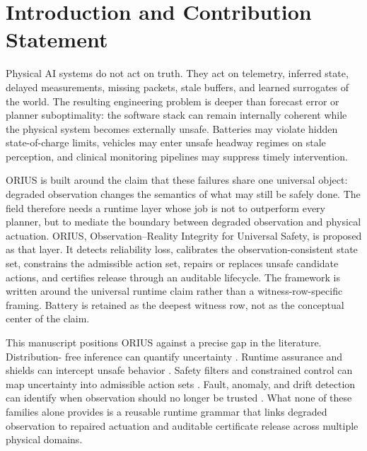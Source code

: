 \section{Introduction and Contribution Statement}
\label{sec:prof-introduction}

Physical AI systems do not act on truth. They act on telemetry, inferred state, delayed
measurements, missing packets, stale buffers, and learned surrogates of the world. The
resulting engineering problem is deeper than forecast error or planner suboptimality:
the software stack can remain internally coherent while the physical system becomes
externally unsafe. Batteries may violate hidden state-of-charge limits, vehicles may
enter unsafe headway regimes on stale perception, and clinical monitoring pipelines
may suppress timely intervention.

ORIUS is built around the claim that these failures share one universal object:
degraded observation changes the semantics of what may still be safely done. The field
therefore needs a runtime layer whose job is not to outperform every planner, but to
mediate the boundary between degraded observation and physical actuation. ORIUS,
Observation--Reality Integrity for Universal Safety, is proposed as that layer. It
detects reliability loss, calibrates the observation-consistent state set, constrains
the admissible action set, repairs or replaces unsafe candidate actions, and certifies
release through an auditable lifecycle. The framework is written around the universal
runtime claim rather than a witness-row-specific framing. Battery is retained as the
deepest witness row, not as the conceptual center of the claim.

This manuscript positions ORIUS against a precise gap in the literature. Distribution-
free inference can quantify uncertainty
\cite{vovk2005algorithmic,lei2018distribution,romano2019conformalized,gibbs2021adaptive,angelopoulos2023gentle,barber2023beyond}.
Runtime assurance and shields can intercept unsafe behavior
\cite{sha1998simplex,sha2001using,desai2019soter,bloem2015shield,bartocci2018introduction,leucker2009brief}.
Safety filters and constrained control can map uncertainty into admissible action sets
\cite{ames2019control,ames2014cbf,wabersich2021predictive,fisac2019general,mayne2005robust,rawlings2017mpc}.
Fault, anomaly, and drift detection can identify when observation should no longer be
trusted \cite{basseville1993detection,page1954continuous,page1955test,hinkley1971inference,pasqualetti2013attack,teixeira2015secure}.
What none of these families alone provides is a reusable runtime grammar that links
degraded observation to repaired actuation and auditable certificate release across
multiple physical domains.

